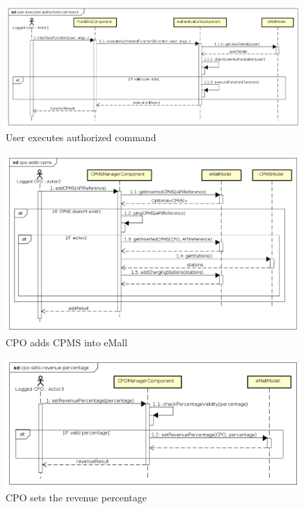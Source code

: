 \begin{figure}[!h]
    \begin{center}
        \includegraphics[keepaspectratio, width=16cm]{Sequence/user-executes-authorized-command.png}
        \caption{User executes authorized command}
        \label{fig:user-executes-authorized-command}
    \end{center}
\end{figure}
\begin{figure}[!h]
    \begin{center}
        \includegraphics[keepaspectratio, width=16cm]{Sequence/cpo-adds-cpms.png}
        \caption{\ac{CPO} adds \ac{CPMS} into \ac{eMall}}
        \label{fig:cpo-adds-cpms}
    \end{center}
\end{figure}
\begin{figure}[!h]
    \begin{center}
        \includegraphics[keepaspectratio, width=16cm]{Sequence/cpo-sets-revenue-percentage.png}
        \caption{\ac{CPO} sets the revenue percentage}
        \label{fig:cpo-sets-revenue-percentage}
    \end{center}
\end{figure}
